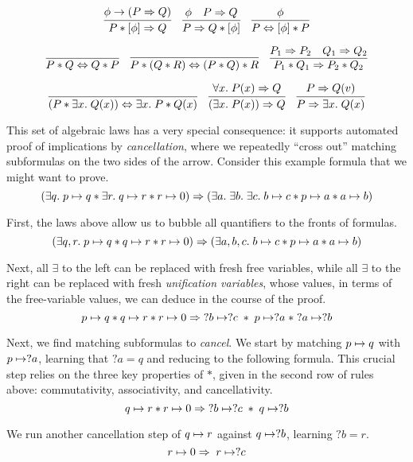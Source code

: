 \documentclass{amsbook}
\theoremstyle{definition}
\theoremstyle{remark}
\numberwithin{section}{chapter}
\numberwithin{equation}{chapter}
\begin{document}
$$\infer{P * \lift{\phi} \Rightarrow Q}{
  \phi \rightarrow (P \Rightarrow Q)
}
\quad \infer{P \Rightarrow Q * \lift{\phi}}{
  \phi
  & P \Rightarrow Q
}
\quad \infer{P \Leftrightarrow \lift{\phi} * P}{
  \phi
}$$

$$\infer{P * Q \Leftrightarrow Q * P}{}
\quad \infer{P * (Q * R) \Leftrightarrow (P * Q) * R}{}
\quad \infer{P_1 * Q_1 \Rightarrow P_2 * Q_2}{
  P_1 \Rightarrow P_2
  & Q_1 \Rightarrow Q_2
}$$

$$\infer{(P * \exists x. \; Q(x)) \Leftrightarrow \exists x. \; P * Q(x)}{}
\quad \infer{(\exists x. \; P(x)) \Rightarrow Q}{
  \forall x. \; P(x) \Rightarrow Q
}
\quad \infer{P \Rightarrow \exists x. \; Q(x)}{
  P \Rightarrow Q(v)
}$$

This set of algebraic laws has a very special consequence: it supports automated proof of implications by \emph{cancellation}, where we repeatedly ``cross out'' matching subformulas on the two sides of the arrow.
Consider this example formula that we might want to prove.
$$(\exists q. \; p \mapsto q * \exists r. \; q \mapsto r * r \mapsto 0) \Rightarrow (\exists a. \; \exists b. \; \exists c. \; b \mapsto c * p \mapsto a * a \mapsto b)$$

First, the laws above allow us to bubble all quantifiers to the fronts of formulas.
$$(\exists q, r. \; p \mapsto q * q \mapsto r * r \mapsto 0) \Rightarrow (\exists a, b, c. \; b \mapsto c * p \mapsto a * a \mapsto b)$$

Next, all $\exists$ to the left can be replaced with fresh free variables, while all $\exists$ to the right can be replaced with fresh \emph{unification variables}, whose values, in terms of the free-variable values, we can deduce in the course of the proof.
$$p \mapsto q * q \mapsto r * r \mapsto 0 \Rightarrow \; ?b \mapsto ?c \; * \; p \mapsto ?a \; * \; ?a \mapsto ?b$$

Next, we find matching subformulas to \emph{cancel}.
We start by matching $p \mapsto q$ with $p \mapsto ?a$, learning that $?a = q$ and reducing to the following formula.
This crucial step relies on the three key properties of $*$, given in the second row of rules above: commutativity, associativity, and cancellativity.
$$q \mapsto r * r \mapsto 0 \Rightarrow \; ?b \mapsto ?c \; * \; q \mapsto ?b$$

We run another cancellation step of $q \mapsto r$ against $q \mapsto ?b$, learning $?b = r$.
$$r \mapsto 0 \Rightarrow \; r \mapsto ?c$$
\end{document}

